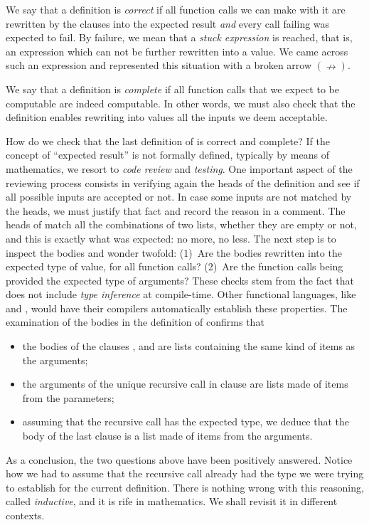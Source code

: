 We say that a definition is \emph{correct} if all function calls we
can make with it are rewritten by the clauses into the expected result
\emph{and} every call failing was expected to fail. By failure, we
mean that a \emph{stuck expression} is reached, that is, an expression
which can not be further rewritten into a value. We came across such an
expression  and represented this situation with
a broken arrow \((\nrightarrow)\).

We say that a definition is \emph{complete} if all function calls that
we expect to be computable are indeed computable. In other words, we
must also check that the definition enables rewriting into values all
the inputs we deem acceptable.

How do we check that the last definition of  is
correct and complete? If the concept of ``expected result'' is not
formally defined, typically by means of mathematics, we resort to
\emph{code review} and \emph{testing}. One important aspect of the
reviewing process consists in verifying again the heads of the
definition and see if all possible inputs are accepted or not. In case
some inputs are not matched by the heads, we must justify that fact
and record the reason in a comment. The heads of 
match all the combinations of two lists, whether they are empty or
not, and this is exactly what was expected: no more, no less. The next
step is to inspect the bodies and wonder twofold: (1)~Are the bodies
rewritten into the expected type of value, for all function calls?
(2)~Are the function calls being provided the expected type of
arguments?  These checks stem from the fact that \Erlang does not
include \emph{type inference} at compile\hyp{}time. Other functional
languages, like \OCaml and \Haskell, would have their compilers
automatically establish these properties. The examination of the
bodies in the definition of  confirms that
\begin{itemize}

  \item the bodies of the clauses \clause{\alpha}, \clause{\beta} and
    \clause{\gamma} are lists containing the same kind of items as the
    arguments;

  \item the arguments of the unique recursive call in clause
    \clause{\delta} are lists made of items from the parameters;

  \item assuming that the recursive call has the expected type, we
    deduce that the body of the last clause is a list made of items
    from the arguments.

\end{itemize}
As a conclusion, the two questions above have been positively
answered. Notice how we had to assume that the recursive call already
had the type we were trying to establish for the current
definition. There is nothing wrong with this reasoning, called
\emph{inductive}, and it is rife in mathematics. We shall revisit it in
different contexts.

